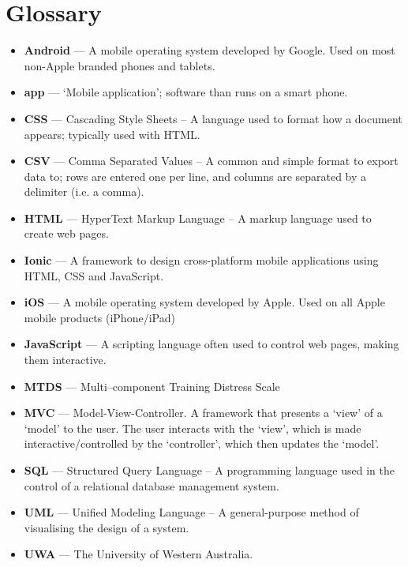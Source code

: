 \documentclass[a4paper, 11pt, titlepage]{article}
\begin{document}
\section{Glossary}
\begin{itemize}
	\item \textbf{Android} --- A mobile operating system developed by Google. Used on most non-Apple branded phones and tablets.
	\item \textbf{app} --- `Mobile application'; software than runs on a smart phone.
	\item \textbf{CSS} --- Cascading Style Sheets -- A language used to format how a document appears; typically used with HTML.
	\item \textbf{CSV} --- Comma Separated Values -- A common and simple format to export data to; rows are entered one per line, and columns are separated by a delimiter (i.e. a comma).
	\item \textbf{HTML} --- HyperText Markup Language -- A markup language used to create web pages.
	\item \textbf{Ionic} --- A framework to design cross-platform mobile applications using HTML, CSS and JavaScript.
	\item \textbf{iOS} --- A mobile operating system developed by Apple. Used on all Apple mobile products (iPhone/iPad)
	\item \textbf{JavaScript} --- A scripting language often used to control web pages, making them interactive.
	\item \textbf{MTDS} --- Multi--component Training Distress Scale
	\item \textbf{MVC} --- Model-View-Controller. A framework that presents a `view' of a `model' to the user. The user interacts with the `view', which is made interactive/controlled by the `controller', which then updates the `model'.
	\item \textbf{SQL} --- Structured Query Language -- A programming language used in the control of a relational database management system.
	\item \textbf{UML} --- Unified Modeling Language -- A general-purpose method of visualising the design of a system.
	\item \textbf{UWA} --- The University of Western Australia.
\end{itemize}

%
%

%
\end{document}
